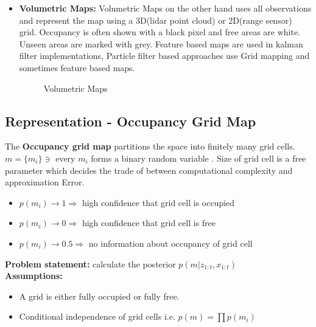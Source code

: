 \documentclass{article}
\begin{document}
\begin{itemize}
\item \textbf{Volumetric Maps:} Volumetric Maps on the other hand uses all observations and represent the map using a 3D(lidar point cloud) or 2D(range sensor) grid. Occupancy is often shown with a black pixel and free areas are white. Unseen areas are marked with grey. Feature based maps are used in kalman filter implementations, Particle filter based approaches use  Grid mapping and sometimes feature based maps. 
    \begin{figure}%
    \centering
    \qquad
    \caption{Volumetric Maps}%
    \label{fig:example}%
    \end{figure}
\end{itemize}

\subsection{Representation - Occupancy Grid Map}
 The \textbf{Occupancy grid map} partitions the space into finitely many grid cells. $m = \{m_i\} \ni $ every $m_i$ forms a binary random variable . Size of grid cell is a free parameter which decides the trade of between computational complexity and approximation Error. 
\begin{itemize}
    \item $p(m_i) \to 1 \Rightarrow $ high confidence that grid cell is occupied
    \item $p(m_i) \to 0 \Rightarrow $ high confidence that grid cell is free
    \item $p(m_i) \to 0.5 \Rightarrow $ no information about occupancy of grid cell
\end{itemize}
\textbf{Problem statement:} calculate the posterior $p(m|z_{1:t},x_{1:t})$ \\
\newline
\textbf{Assumptions:}
\begin{itemize}
        \item A grid is either fully occupied or fully free.
        \item Conditional independence of grid cells i.e.  $p(m) = \prod  p(m_i)$
\end{itemize}
\end{document}
